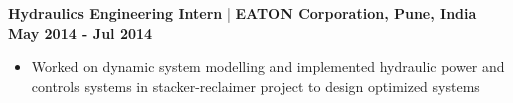 \documentclass[10pt,a4paper]{extarticle}
\begin{document}
\iffalse
\textbf{Junior Engineer} \hspace{4.95cm} \textbf{A. R. Engineers and Consultants} \hfill\textbf{Aug 2015 - Jan 2016}
\vspace{-0.5em}
\begin{itemize}[leftmargin = 0.6cm]
\setlength\itemsep{-0.2em}
\item My work entailed design interpretation before manufacturing the parts in CNCs, with particular attention to quality control (ISO standards)
\item After the parts were manufactured, final check to affirm no errors while manufacturing is carried out
\end{itemize}
\fi
\textbf{Hydraulics Engineering Intern} | \textbf{EATON Corporation, Pune, India} \hfill\textbf{May 2014 - Jul 2014}
\vspace{-0.5em}
\begin{itemize}[leftmargin = 0.6cm]
\setlength\itemsep{-0.2em}
\item Worked on dynamic system modelling and implemented hydraulic power and controls systems in stacker-reclaimer project to design optimized systems
\end{itemize}

\vspace{-0.2cm}
\end{document}

